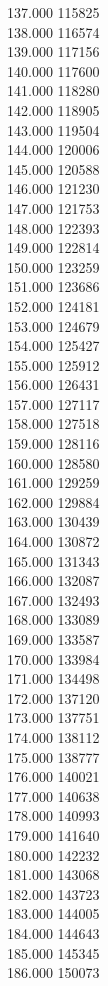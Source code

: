 { 137.000	115825 \\
 138.000	116574 \\
 139.000	117156 \\
 140.000	117600 \\
 141.000	118280 \\
 142.000	118905 \\
 143.000	119504 \\
 144.000	120006 \\
 145.000	120588 \\
 146.000	121230 \\
 147.000	121753 \\
 148.000	122393 \\
 149.000	122814 \\
 150.000	123259 \\
 151.000	123686 \\
 152.000	124181 \\
 153.000	124679 \\
 154.000	125427 \\
 155.000	125912 \\
 156.000	126431 \\
 157.000	127117 \\
 158.000	127518 \\
 159.000	128116 \\
 160.000	128580 \\
 161.000	129259 \\
 162.000	129884 \\
 163.000	130439 \\
 164.000	130872 \\
 165.000	131343 \\
 166.000	132087 \\
 167.000	132493 \\
 168.000	133089 \\
 169.000	133587 \\
 170.000	133984 \\
 171.000	134498 \\
 172.000	137120 \\
 173.000	137751 \\
 174.000	138112 \\
 175.000	138777 \\
 176.000	140021 \\
 177.000	140638 \\
 178.000	140993 \\
 179.000	141640 \\
 180.000	142232 \\
 181.000	143068 \\
 182.000	143723 \\
 183.000	144005 \\
 184.000	144643 \\
 185.000	145345 \\
 186.000	150073 \\
}
